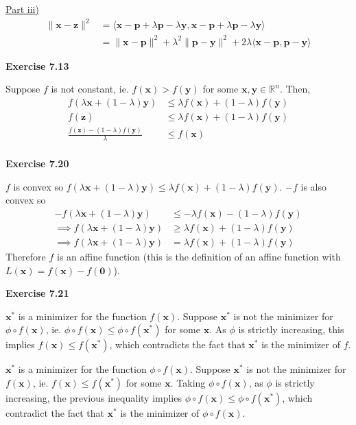 \documentclass[letterpaper,12pt]{article}
\newcommand{\vect}[1]{\mathbf{#1}}
\begin{document}
\underline{Part iii)}
\begin{align*}
\| \vect{x} - \vect{z} \|^2 &= \langle \vect{x} - \vect{p} + \lambda \vect{p} - \lambda \vect{y}, \vect{x} - \vect{p} + \lambda \vect{p} - \lambda \vect{y} \rangle \\
&= \| \vect{x} - \vect{p} \|^2 + \lambda^2 \| \vect{p} - \vect{y} \|^2 + 2 \lambda \langle \vect{x} - \vect{p}, \vect{p} - \vect{y} \rangle
\end{align*}

\textbf{Exercise 7.13}

Suppose $f$ is not constant, ie. $f(\vect{x}) > f(\vect{y})$ for some $\vect{x}, \vect{y} \in \mathbb R^n$. Then,
\begin{align*}
f(\lambda \vect{x} + (1 - \lambda) \vect{y}) &\leq \lambda f(\vect{x}) + (1 - \lambda)f(\vect{y}) \\
f(\vect{z}) &\leq \lambda f(\vect{x}) + (1 - \lambda)f(\vect{y}) \\
\frac{f(\vect{z}) - (1 - \lambda) f(\vect{y})}{\lambda} &\leq f(\vect{x}) \\
\end{align*}

\textbf{Exercise 7.20}

$f$ is convex so $f(\lambda \vect{x} + (1 - \lambda) \vect{y}) \leq \lambda f(\vect{x}) + (1 - \lambda) f(\vect{y})$. $-f$ is also convex so 
\begin{align*}
-f(\lambda \vect{x} + (1 - \lambda) \vect{y}) &\leq -\lambda f(\vect{x}) - (1 - \lambda) f(\vect{y}) \\ 
\implies f(\lambda \vect{x} + (1 - \lambda) \vect{y}) &\geq \lambda f(\vect{x}) + (1 - \lambda) f(\vect{y}) \\ 
\implies f(\lambda \vect{x} + (1 - \lambda) \vect{y}) &= \lambda f(\vect{x}) + (1 - \lambda) f(\vect{y})
\end{align*}
Therefore $f$ is an affine function (this is the definition of an affine function with $L(\vect{x}) = f(\vect{x}) - f(\vect{0})$).

\textbf{Exercise 7.21}

$\vect{x}^*$ is a minimizer for the function $f(\vect{x})$. Suppose $\vect{x}^*$ is not the minimizer for $\phi \circ f(\vect{x})$, ie. $\phi \circ f(\vect{x}) \leq \phi \circ f(\vect{x}^*)$ for some $\vect{x}$. As $\phi$ is strictly increasing, this implies $f(\vect{x}) \leq f(\vect{x}^*)$, which contradicts the fact that $\vect{x}^*$ is the minimizer of $f$.

$\vect{x}^*$ is a minimizer for the function $\phi \circ f(\vect{x})$. Suppose $\vect{x}^*$ is not the minimizer for $f(\vect{x})$, ie. $f(\vect{x}) \leq f(\vect{x}^*)$ for some $\vect{x}$.
Taking $\phi \circ f(\vect{x})$, as $\phi$ is strictly increasing, the previous inequality implies $\phi \circ f(\vect{x}) \leq \phi \circ f(\vect{x}^*)$, which contradict the fact that $\vect{x}^*$ is the minimizer of $\phi \circ f(\vect{x})$.
\end{document}
